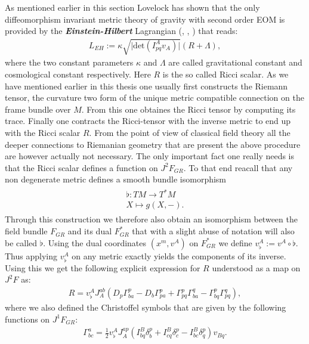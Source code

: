 \documentclass[a4paper,12pt, DIV=14, BCOR=5mm, twoside, headsepline]{scrbook}
\begin{document}
As mentioned earlier in this section Lovelock has shown that the only diffeomorphism invariant metric theory of gravity with second order EOM is provided by the \textit{\textbf{Einstein-Hilbert}} Lagrangian (\cite{Lovelock1969}, \cite{doi:10.1063/1.1665613}, \cite{doi:10.1063/1.1666069}) that reads:
\begin{align}
    L_{EH} := \kappa \sqrt{\vert \mathrm{det} \left ( I^A_{pq}v_A \right ) \vert }  \left( R + \Lambda \right ),
\end{align}
where the two constant parameters $\kappa$ and $\Lambda$ are called gravitational constant and cosmological constant respectively. Here $R$ is the so called Ricci scalar. As we have mentioned earlier in this thesis one usually first constructs the Riemann tensor, the curvature two form of the unique metric compatible connection on the frame bundle over $M$. From this one obtaines the Ricci tensor by computing its trace. Finally one contracts the Ricci-tensor with the inverse metric to end up with the Ricci scalar $R$. From the point of view of classical field theory all the deeper connections to Riemanian geometry that are present the above procedure are however actually not necessary. The only important fact one really needs is that the Ricci scalar defines a function on $J^2F_{GR}$. To that end reacall that any non degenerate metric defines a smooth bundle isomorphism 
\begin{align}\label{music}
\begin{aligned}
\flat : TM \longrightarrow T^{\ast}M\\
X \longmapsto g(X,-) .
\end{aligned}
\end{align}
Through this construction we therefore also obtain an isomorphism between the field bundle $F_{GR}$ and its dual $F_{GR}^{\ast}$ that with a slight abuse of notation will also be called $\flat$. 
Using the dual coordinates $(x^m,v^A)$ on $F_{GR}^{\ast}$ we define $v^A_{\flat} := v^A \circ \flat$. Thus applying $v^A_{\flat}$ on any metric exactly yields the components of its inverse. Using this we get the following explicit expression for $R$ understood as a map on $J^2F$ as:
\begin{align}
R = v_{\flat}^A J_A^{ab} \left ( D_p \Gamma^p_{ba} - D_b \Gamma^p_{pa} + \Gamma^p_{pq} \Gamma^q_{ba} - \Gamma^p_{bq} \Gamma^q_{pq} \right ),
\end{align}
where we also defined the Christoffel symbols that are given by the following functions on $J^1F_{GR}$:
\begin{align}
\Gamma^a_{bc} = \frac{1}{2} v_{\flat}^A J_A^{ap} \left ( I^B_{bq}\delta^p_b + I^B_{cq}\delta^p_c - I^B_{bc}\delta^p_q  \right ) v_{Bq}.
\end{align}
\end{document}
